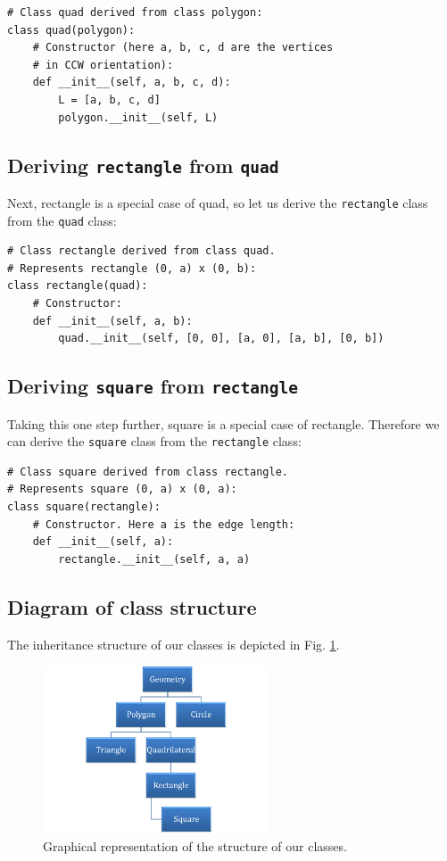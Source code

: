 \begin{verbatim}
# Class quad derived from class polygon:
class quad(polygon):
    # Constructor (here a, b, c, d are the vertices
    # in CCW orientation):
    def __init__(self, a, b, c, d):
        L = [a, b, c, d]
        polygon.__init__(self, L)
\end{verbatim}

\subsection{Deriving {\tt rectangle} from {\tt quad}}

Next, rectangle is a special case of quad, so let us derive the 
{\tt rectangle} class from the {\tt quad} class:

\begin{verbatim}
# Class rectangle derived from class quad.
# Represents rectangle (0, a) x (0, b):
class rectangle(quad):
    # Constructor:
    def __init__(self, a, b):
        quad.__init__(self, [0, 0], [a, 0], [a, b], [0, b])
\end{verbatim}

\subsection{Deriving {\tt square} from {\tt rectangle}}

Taking this one step further, square is a special case of rectangle. Therefore 
we can derive the {\tt square} class from the {\tt rectangle} class:

\begin{verbatim}
# Class square derived from class rectangle.
# Represents square (0, a) x (0, a):
class square(rectangle):
    # Constructor. Here a is the edge length:
    def __init__(self, a):
        rectangle.__init__(self, a, a)
\end{verbatim}

\subsection{Diagram of class structure}

The inheritance structure of our classes is depicted in Fig. \ref{fig:classes}.

\begin{figure}[!ht]
\begin{center}
\includegraphics[width=0.6\textwidth]{imgp/classes.png}
\end{center}
\vspace{-2mm}
\caption{Graphical representation of the structure of our classes.}
\label{fig:classes}
\end{figure}

